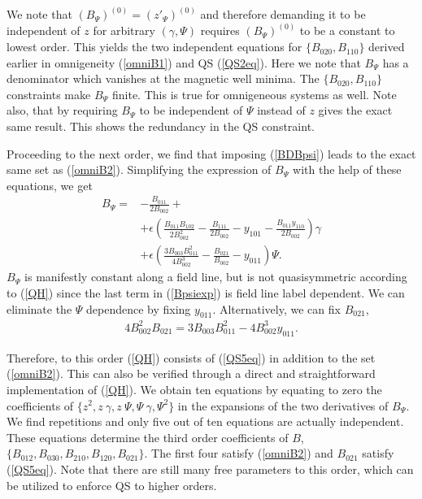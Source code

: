 \documentclass[aip,pop,reprint]{revtex4-1}
\newcommand*{\ep}{\epsilon}
\begin{document}
We note that $(B_\Psi)^{(0)}=(z'_\Psi)^{(0)}$ and therefore demanding it to be independent of $z$ for arbitrary $(\gamma,\Psi)$ requires $(B_\Psi)^{(0)}$ to be a constant to lowest order. This yields the two independent equations for $\{B_{020},B_{110}\}$ derived earlier in omnigeneity (\ref{omniB1}) and QS (\ref{QS2eq}). Here we note that $B_\Psi$ has a denominator which vanishes at the magnetic well minima. The $\{B_{020},B_{110}\}$ constraints make $B_\Psi$ finite. This is true for omnigeneous systems as well. Note also, that by requiring $B_\Psi$ to be independent of $\Psi$ instead of $z$ gives the exact same result. This shows the redundancy in the QS constraint.

Proceeding to the next order, we find that imposing (\ref{BDBpsi}) leads to the exact same set as (\ref{omniB2}). Simplifying the expression of $B_\Psi$ with the help of these equations, we get
\begin{align}
B_\Psi= &-\frac{B_{011}}{2 B_{002}} \label{Bpsiexp} +\\ &+\ep  \left(\frac{B_{011} B_{102}}{2 B_{002}^2} - \frac{B_{111}}{2 B_{002}}-y_{101}- \frac{B_{011} y_{110}}{2 B_{002}}\right) \gamma  \nonumber\\ &+ \ep\left(\frac{3 B_{003} B_{011}^2}{4 B_{002}^3} - \frac{B_{021}}{B_{002}} - y_{011}\right) \Psi.  \nonumber
\end{align}
$B_\Psi$ is manifestly constant along a field line, but is not quasisymmetric according to (\ref{QH}) since the last term in (\ref{Bpsiexp}) is field line label dependent. We can eliminate the $\Psi$ dependence by fixing $y_{011}$. Alternatively, we can fix $B_{021}$,
\begin{align}
4 B_{002}^2 B_{021} = 3 B_{003} B_{011}^2 - 4 B_{002}^3 y_{011}\label{QS5eq}.
\end{align}
 
Therefore, to this order (\ref{QH}) consists of (\ref{QS5eq}) in addition to the set (\ref{omniB2}). This can also be verified through a direct and straightforward implementation of (\ref{QH}). We obtain ten equations by equating to zero the coefficients of $\{z^2,z\:\gamma,z\:\Psi,\Psi\:\gamma,\Psi^2\}$ in the expansions of the two derivatives of $B_\Psi$. We find repetitions and only five out of ten equations are actually independent. These equations determine the third order coefficients of $B$, $\{B_{012},B_{030},B_{210},B_{120},B_{021}\}$. The first four satisfy (\ref{omniB2}) and $B_{021}$ satisfy (\ref{QS5eq}). Note that there are still many free parameters to this order, which can be utilized to enforce QS to higher orders.
\end{document}
